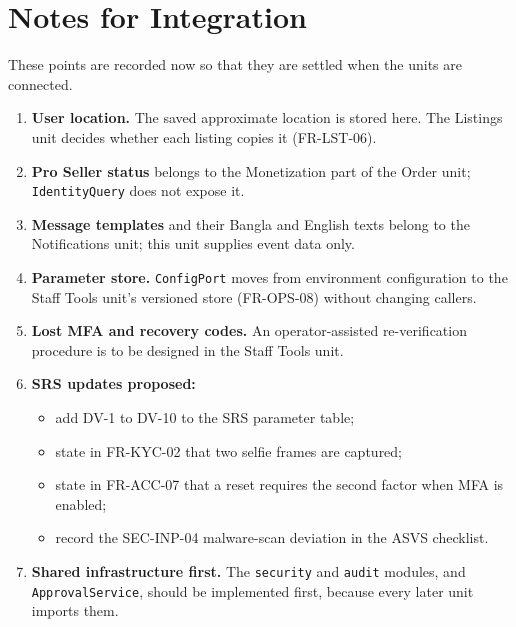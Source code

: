 \documentclass[11pt,a4paper]{article}
\begin{document}
\section{Notes for Integration}
These points are recorded now so that they are settled when the units are connected.
\begin{enumerate}[label=\textbf{I-\arabic*}, leftmargin=*, nosep]
  \item \textbf{User location.} The saved approximate location is stored here. The Listings unit decides whether each listing copies it (FR-LST-06).
  \item \textbf{Pro Seller status} belongs to the Monetization part of the Order unit; \texttt{IdentityQuery} does not expose it.
  \item \textbf{Message templates} and their Bangla and English texts belong to the Notifications unit; this unit supplies event data only.
  \item \textbf{Parameter store.} \texttt{ConfigPort} moves from environment configuration to the Staff Tools unit's versioned store (FR-OPS-08) without changing callers.
  \item \textbf{Lost MFA and recovery codes.} An operator-assisted re-verification procedure is to be designed in the Staff Tools unit.
  \item \textbf{SRS updates proposed:}
  \begin{itemize}[nosep]
    \item add DV-1 to DV-10 to the SRS parameter table;
    \item state in FR-KYC-02 that two selfie frames are captured;
    \item state in FR-ACC-07 that a reset requires the second factor when MFA is enabled;
    \item record the SEC-INP-04 malware-scan deviation in the ASVS checklist.
  \end{itemize}
  \item \textbf{Shared infrastructure first.} The \texttt{security} and \texttt{audit} modules, and \texttt{ApprovalService}, should be implemented first, because every later unit imports them.
\end{enumerate}

\appendix
\end{document}
